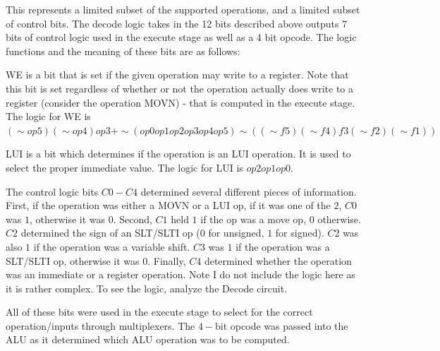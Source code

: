 \documentclass{article}
\begin{document}
This represents a limited subset of the supported operations, and a limited subset of control bits.  The decode logic takes in the 12 bits described above outputs 7 bits of control logic used in the execute stage as well as a 4 bit opcode.  The logic functions and the meaning of these bits are as follows:

WE is a bit that is set if the given operation may write to a register.  Note that this bit is set regardless of whether or not the operation actually does write to a register (consider the operation MOVN) - that is computed in the execute stage.  The logic for WE is $(\sim op5) (\sim op4) op3 + \sim(op0 op1 op2 op3 op4 op5) \sim((\sim f5) (\sim f4) f3 (\sim f2) (\sim f1))$

LUI is a bit which determines if the operation is an LUI operation.  It is used to select the proper immediate value.  The logic for LUI is $op2 op1 op0$.

The control logic bits $C0-C4$ determined several different pieces of information.  First, if the operation was either a MOVN or a LUI op, if it was one of the $2$, $C0$ was $1$, otherwise it was $0$.  Second, $C1$ held $1$ if the op was a move op, $0$ otherwise.  $C2$ determined the sign of an SLT/SLTI op ($0$ for unsigned, $1$ for signed).  $C2$ was also $1$ if the operation was a variable shift.  $C3$ was $1$ if the operation was a SLT/SLTI op, otherwise it was $0$.  Finally, $C4$ determined whether the operation was an immediate or a register operation.  Note I do not include the logic here as it is rather complex.  To see the logic, analyze the Decode circuit.

All of these bits were used in the execute stage to select for the correct operation/inputs through multiplexers.  The $4-$bit opcode was passed into the ALU as it determined which ALU operation was to be computed.
\end{document}
